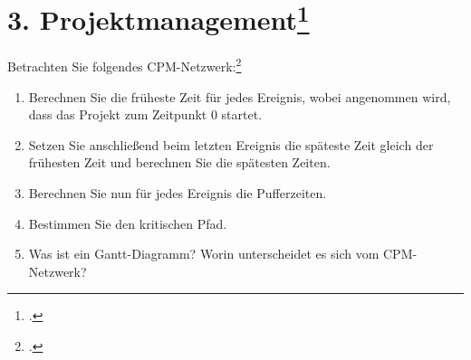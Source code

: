 \documentclass{lehramt-informatik}
\begin{document}
\begin{enumerate}
\begin{antwort}
\begin{center}
\end{center}
\end{antwort}
\end{enumerate}

%

\section{3. Projektmanagement\footcite{sosy:pu:4}}

Betrachten Sie folgendes CPM-Netzwerk:\footcite{examen:46116:2015:09}

\begin{center}
\end{center}
\begin{enumerate}


\item Berechnen Sie die früheste Zeit für jedes Ereignis, wobei
angenommen wird, dass das Projekt zum Zeitpunkt 0 startet.


\item Setzen Sie anschließend beim letzten Ereignis die späteste Zeit
gleich der frühesten Zeit und berechnen Sie die spätesten Zeiten.


\item Berechnen Sie nun für jedes Ereignis die Pufferzeiten.


\item Bestimmen Sie den kritischen Pfad.


\item Was ist ein Gantt-Diagramm? Worin unterscheidet es sich vom
CPM-Netzwerk?

\end{enumerate}

\literatur
\end{document}
